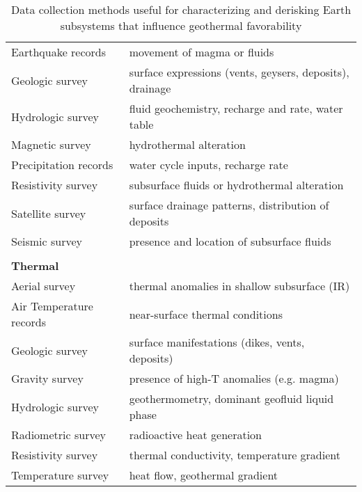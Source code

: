 \begin{table}[!htp]
\begin{tabular}{ll}
Earthquake records      & movement of magma or fluids                              \\
Geologic survey         & surface expressions (vents, geysers, deposits), drainage \\
Hydrologic survey       & fluid geochemistry, recharge and rate, water table       \\
Magnetic survey         & hydrothermal alteration                                  \\
Precipitation records   & water cycle inputs, recharge rate                        \\
Resistivity survey      & subsurface fluids or hydrothermal alteration             \\
Satellite survey        & surface drainage patterns, distribution of deposits      \\
Seismic survey          & presence and location of subsurface fluids               \\
                        &                                                          \\
\textbf{Thermal}        &                                                          \\ \hline
Aerial survey           & thermal anomalies in shallow subsurface (IR)             \\
Air Temperature records & near-surface thermal conditions                          \\
Geologic survey         & surface manifestations (dikes, vents, deposits)          \\
Gravity survey          & presence of high-T anomalies (e.g. magma)                \\
Hydrologic survey       & geothermometry, dominant geofluid liquid phase           \\
Radiometric survey      & radioactive heat generation                              \\
Resistivity survey      & thermal conductivity, temperature gradient               \\
Temperature survey      & heat flow, geothermal gradient                          
\end{tabular}
\caption{Data collection methods useful for characterizing and derisking Earth subsystems that influence geothermal favorability}
\label{tab:surveytypes}
\end{table}

